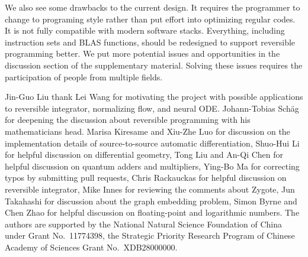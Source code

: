 \documentclass{article}
\newcommand{\<}{\langle}
\renewcommand{\>}{\rangle}
\theoremstyle{definition}\newtheorem{definition}{\textit{Definition}}
\begin{document}
We also see some drawbacks to the current design. It requires the programmer to change to programing style rather than put effort into optimizing regular codes. It is not fully compatible with modern software stacks. Everything, including instruction sets and BLAS functions, should be redesigned to support reversible programming better. We put more potential issues and opportunities in the discussion section of the supplementary material. Solving these issues requires the participation of people from multiple fields.

\begin{ack}
Jin-Guo Liu thank Lei Wang for motivating the project with possible applications to reversible integrator, normalizing flow, and neural ODE.
Johann-Tobias Schäg for deepening the discussion about reversible programming with his mathematicians head.
Marisa Kiresame and Xiu-Zhe Luo for discussion on the implementation details of source-to-source automatic differentiation,
Shuo-Hui Li for helpful discussion on differential geometry, Tong Liu and An-Qi Chen for helpful discussion on quantum adders and multipliers, Ying-Bo Ma for correcting typos by submitting pull requests, Chris Rackauckas for helpful discussion on reversible integrator, Mike Innes for reviewing the comments about Zygote, Jun Takahashi for discussion about the graph embedding problem, Simon Byrne and Chen Zhao for helpful discussion on floating-point and logarithmic numbers.
The authors are supported by the National Natural Science Foundation of China under Grant No.~11774398, the Strategic Priority Research Program of Chinese Academy of Sciences Grant No.~XDB28000000.
\end{ack}



\end{document}
